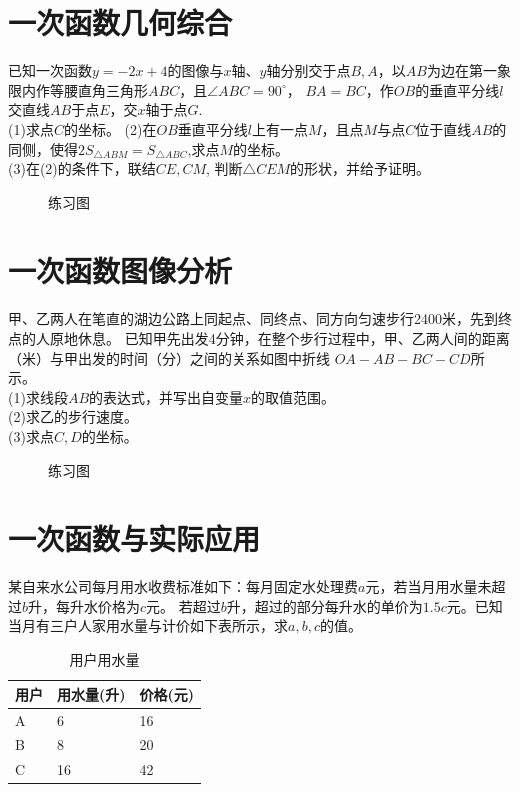 \section{一次函数几何综合}
\begin{problem}
已知一次函数$y=-2x+4$的图像与$x$轴、$y$轴分别交于点$B,A$，以$AB$为边在第一象限内作等腰直角三角形$ABC$，且$\angle ABC=90^\circ$，
$BA=BC$，作$OB$的垂直平分线$l$交直线$AB$于点$E$，交$x$轴于点$G$. \\
(1)求点$C$的坐标。
(2)在$OB$垂直平分线$l$上有一点$M$，且点$M$与点$C$位于直线$AB$的同侧，使得$2S_{\triangle ABM}=S_{\triangle ABC}$,求点$M$的坐标。\\
(3)在(2)的条件下，联结$CE,CM$, 判断$\triangle CEM$的形状，并给予证明。
\end{problem}
\begin{figure}[H]
    \centering
    \resizebox{4cm}{!}{}
    \caption{练习图}
\end{figure}
\clearpage
\section{一次函数图像分析}
\begin{problem}
甲、乙两人在笔直的湖边公路上同起点、同终点、同方向匀速步行2400米，先到终点的人原地休息。
已知甲先出发4分钟，在整个步行过程中，甲、乙两人间的距离（米）与甲出发的时间（分）之间的关系如图中折线
$OA-AB-BC-CD$所示。\\
(1)求线段$AB$的表达式，并写出自变量$x$的取值范围。 \\
(2)求乙的步行速度。 \\
(3)求点$C,D$的坐标。
\end{problem}
\begin{figure}[H]
    \centering
    \resizebox{6cm}{!}{}
    \caption{练习图}
\end{figure}
\clearpage
\section{一次函数与实际应用}
\begin{problem}
某自来水公司每月用水收费标准如下：每月固定水处理费$a$元，若当月用水量未超过$b$升，每升水价格为$c$元。
若超过$b$升，超过的部分每升水的单价为$1.5c$元。已知当月有三户人家用水量与计价如下表所示，求$a,b,c$的值。
\end{problem}
\begin{table}[ht]
    \centering
    \caption{用户用水量}
    \begin{tabular}{|l|l|l|}
        \hline
        用户 & 用水量(升) & 价格(元) \\
        \hline
        A  & 6      & 16    \\
        \hline
        B  & 8      & 20    \\
        \hline
        C  & 16     & 42    \\
        \hline
    \end{tabular}
\end{table}
\clearpage
